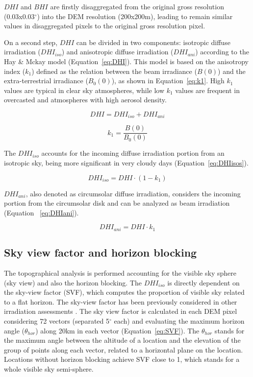 \documentclass[article]{jss}
\begin{document}
$DHI$ and $BHI$ are firstly disaggregated from the original gross
resolution (0.03x0.03$^\circ$) into the DEM resolution (200x200m),
leading to remain similar values in disaggregated pixels to the
original gross resolution pixel.

On a second step, $DHI$ can be divided in two components:
isotropic diffuse irradiation ($DHI_{iso}$) and anisotropic
diffuse irradiation ($DHI_{ani}$) according to the Hay \& Mckay
model \citep{Hay.Mckay1985} (Equation~\ref{eq:DHI}). This model is
based on the anisotropy index ($k_{1}$) defined as the relation
between the beam irradiance ($B(0)$) and the extra-terrestrial
irradiance ($B_{0}(0)$), as shown in Equation~\ref{eq:k1}. High
$k_{1}$ values are typical in clear sky atmospheres, while low
$k_{1}$ values are frequent in overcasted and atmospheres with high
aerosol density.


\begin{equation}
  \label{eq:DHI}
  DHI=DHI_{iso}+DHI_{ani}
\end{equation}

\begin{equation}
  \label{eq:k1}
  k_{1}=\frac{B(0)}{B_{0}(0)} 
\end{equation}

The $DHI_{iso}$ accounts for the incoming diffuse irradiation
portion from an isotropic sky, being more significant in very
cloudy days (Equation~\ref{eq:DHIisos}).

\begin{equation}
  \label{eq:DHIisos}
  DHI_{iso}=DHI\cdot{}(1-k_{1})
\end{equation}

$DHI_{ani}$, also denoted as circumsolar diffuse irradiation,
considers the incoming portion from the circumsolar disk and can be
analyzed as beam irradiation \citep{Perpinan-Lamigueiro2012a}
(Equation ~\ref{eq:DHIani}).

\begin{equation}
  \label{eq:DHIani}
  DHI_{ani}=DHI\cdot{}k_{1}
\end{equation}


\subsection{Sky view factor and horizon blocking}
\label{sec:sky-view-factor}

The topographical analysis is performed accounting for the visible
sky sphere (sky view) and also the horizon blocking. The
$DHI_{iso}$ is directly dependent on the sky-view factor (SVF),
which computes the proportion of visible sky related to a flat
horizon. The sky-view factor has been previously considered in
other irradiation assessments \citep{Ruiz-Arias.Cebecauer.ea2010, Corripio2003}. The sky view factor is calculated in each DEM
pixel considering 72 vectors (separated 5$^\circ$ each) and evaluating
the maximum horizon angle ($\theta_{hor}$) along 20km in each
vector (Equation~\ref{eq:SVF}). The $\theta_{hor}$ stands for the
maximum angle between the altitude of a location and the elevation
of the group of points along each vector, related to a horizontal
plane on the location. Locations without horizon blocking achieve
SVF close to 1, which stands for a whole visible sky semi-sphere.
\end{document}
